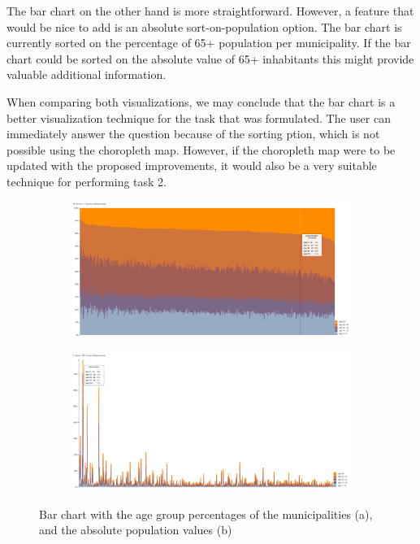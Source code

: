 The bar chart on the other hand is more straightforward. However, a feature that would be nice to add is an absolute sort-on-population option. The bar chart is currently sorted on the percentage of 65+ population per municipality. If the bar chart could be sorted on the absolute value of 65+ inhabitants this might provide valuable additional information.

When comparing both visualizations, we may conclude that the bar chart is a better visualization technique for the task that was formulated. The user can immediately answer the question because of the sorting ption, which is not possible using the choropleth map. However, if the choropleth map were to be updated with the proposed improvements, it would also be a very suitable technique for performing task 2.

\begin{figure}[h!]
    \centering
    \captionsetup{justification=centering,margin=0.5cm}
    \begin{subfigure}[t]{0.48\textwidth}
        \includegraphics[width=\textwidth]{img/normalizedbarchart.png}
        \caption{ }
    \end{subfigure}
    \begin{subfigure}[t]{0.48\textwidth}
        \includegraphics[width=\textwidth]{img/normalbarchart.png}
        \caption{ }
    \end{subfigure}
    \caption{Bar chart with the age group percentages of the municipalities (a), and the absolute population values (b)}
    \label{fig:bar}
\end{figure}

